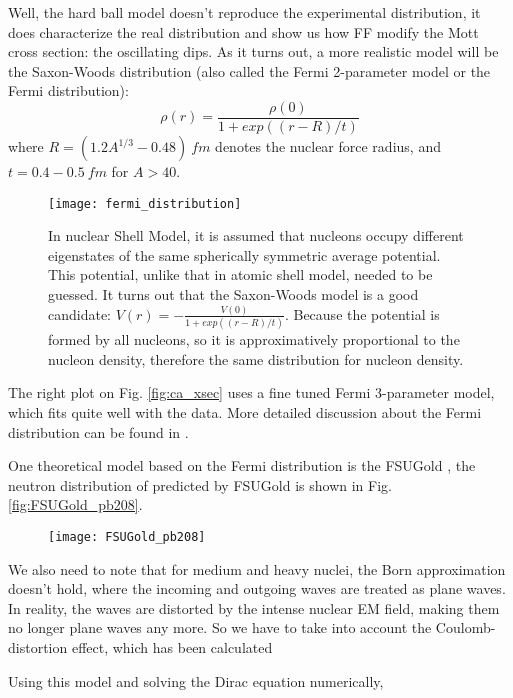 Well, the hard ball model doesn't reproduce the experimental distribution, it does
characterize the real distribution and show us how FF modify the Mott cross section:
the oscillating dips. As it turns out, a more realistic model will be the
Saxon-Woods distribution (also called the Fermi 2-parameter model or the Fermi
distribution):
\begin{equation}
    \rho(r) = \frac{\rho(0)}{1 + exp((r-R)/t)}
\end{equation}
where $R = (1.2A^{1/3} - 0.48) \ fm$ denotes the nuclear force radius, 
and $t = 0.4-0.5 \ fm$ for  $A > 40$.
\begin{figure}
    \texttt{[image: fermi\_distribution]}
    \caption{In nuclear Shell Model, it is assumed that nucleons occupy 
    different eigenstates of the same spherically symmetric average potential.
    This potential, unlike that in atomic shell model, needed to be guessed. 
    It turns out that the Saxon-Woods model is a good candidate: 
    $V(r) = -\frac{V(0)}{1+exp((r-R)/t)}$. Because the potential is formed
    by all nucleons, so it is approximatively proportional to the nucleon density, 
    therefore the same distribution for nucleon density.} 
\end{figure}
The right plot on Fig. \ref{fig:ca_xsec} uses a fine tuned Fermi 3-parameter model,
which fits quite well with the data. More detailed discussion about the Fermi 
distribution can be found in \cite{Maximon:1966sqn}.

One theoretical model based on the Fermi distribution is the FSUGold \cite{PhysRevLett.95.122501},
the neutron distribution of \Pb predicted by FSUGold is shown in Fig. \ref{fig:FSUGold_pb208}.
\begin{figure}[h!]
    \centering
    \texttt{[image: FSUGold\_pb208]}
\end{figure}

We also need to note that for medium and heavy nuclei, the Born approximation
doesn't hold, where the incoming and outgoing waves are treated as plane waves.
In reality, the waves are distorted by the intense nuclear EM field, making them
no longer plane waves any more. So we have to take into account the 
Coulomb-distortion effect, which has been calculated

Using this model and solving the Dirac equation numerically,


